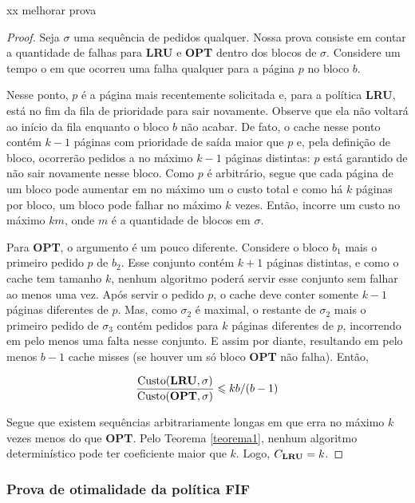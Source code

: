 \documentclass[a4paper,oneside,reqno,12pt]{amsart}
\begin{document}
xx melhorar prova
\begin{proof}
  Seja \(\sigma\) uma sequência de pedidos qualquer. Nossa prova consiste em contar a quantidade de falhas para \textbf{LRU} e \textbf{OPT} dentro dos blocos de \(\sigma\). Considere um tempo o em que ocorreu uma falha qualquer para a página \(p\) no bloco \(b\).

  Nesse ponto, \(p\) é a página mais recentemente solicitada e, para a política \textbf{LRU}, está no fim da fila de prioridade para sair novamente. Observe que ela não voltará ao início da fila enquanto o bloco \(b\) não acabar. De fato, o cache nesse ponto contém \(k-1\) páginas com prioridade de saída maior que \(p\) e, pela definição de bloco, ocorrerão pedidos a no máximo \(k-1\) páginas distintas: \(p\) está garantido de não sair novamente nesse bloco. Como \(p\) é arbitrário, segue que cada página de um bloco pode aumentar em no máximo um o custo total e como há \(k\) páginas por bloco, um bloco pode falhar no máximo \(k\) vezes. Então,  incorre um custo no máximo \(km\), onde \(m\) é a quantidade de blocos em \(\sigma\).

  Para \textbf{OPT}, o argumento é um pouco diferente. Considere o bloco \(b_1\) mais o primeiro pedido \(p\) de \(b_2\). Esse conjunto contém \(k+1\) páginas distintas, e como o cache tem tamanho \(k\), nenhum algoritmo poderá servir esse conjunto sem falhar ao menos uma vez. Após servir o pedido \(p\), o cache deve conter somente \(k-1\) páginas diferentes de \(p\). Mas, como \(\sigma_2\) é maximal, o restante de \(\sigma_2\) mais o primeiro pedido de \(\sigma_3\) contém pedidos para \(k\) páginas diferentes de \(p\), incorrendo em pelo menos uma falta nesse conjunto. E assim por diante, resultando em pelo menos \(b - 1\) cache misses (se houver um só bloco \textbf{OPT} não falha). Então, 

  \begin{equation*}
    \frac{\text{Custo}(\bold{LRU}, \sigma)}{\text{Custo}(\bold{OPT}, \sigma)} \leqslant kb/(b-1)
  \end{equation*}

  Segue que existem sequências arbitrariamente longas em que  erra no máximo \(k\) vezes menos do que \textbf{OPT}. Pelo Teorema \ref{teorema1}, nenhum algoritmo determinístico pode ter coeficiente maior que \(k\). Logo, \(C_{\bold{LRU}} = k\).
\end{proof}


\subsubsection{Prova de otimalidade da política \textbf{FIF}}
\end{document}

